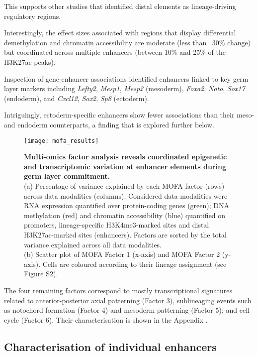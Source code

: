 This supports other studies that identified distal elements as lineage-driving regulatory regions. 

Interestingly, the effect sizes associated with regions that display differential demethylation and chromatin accessibility are moderate (less than ~30\% change) but coordinated across multiple enhancers (between 10\% and 25\% of the H3K27ac peaks). 

Inspection of gene-enhancer associations identified enhancers linked to key germ layer markers including \textit{Lefty2}, \textit{Mesp1}, \textit{Mesp2} (mesoderm), \textit{Foxa2}, \textit{Noto}, \textit{Sox17} (endoderm), and \textit{Cxcl12}, \textit{Sox2}, \textit{Sp8} (ectoderm). 

Intriguingly, ectoderm-specific enhancers show fewer associations than their meso- and endoderm counterparts, a finding that is explored further below.

\begin{figure}[H]
	\centering
	\texttt{[image: mofa\_results]}
	\caption[]{
	\textbf{Multi-omics factor analysis reveals coordinated epigenetic and transcriptomic variation at enhancer elements during germ layer commitment.} \\
	(a) Percentage of variance explained by each MOFA factor (rows) across data modalities (columns). Considered data modalities were RNA expression quantified over protein-coding genes (green); DNA methylation (red) and chromatin accessibility (blue) quantified on promoters,  lineage-specific H3K4me3-marked sites and distal H3K27ac-marked sites (enhancers). Factors are sorted by the total variance explained across all data modalities. \\
	(b) Scatter plot of MOFA Factor 1 (x-axis) and MOFA Factor 2 (y-axis). Cells are coloured according to their lineage assignment (see Figure S2). \\
	}
	\label{fig:mofa_results}
\end{figure}

The four remaining factors correspond to mostly transcriptional signatures related to anterior-posterior axial patterning (Factor 3), sublineaging events such as notochord formation (Factor 4) and mesoderm patterning (Factor 5); and cell cycle (Factor 6). Their characterisation is shown in the Appendix .

\subsection{Characterisation of individual enhancers}

